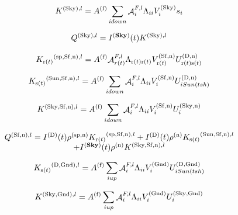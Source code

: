 \begin{equation}
{K^{{\rm{(Sky), }}l}} = {A^{{\rm{(f)}}}}\sum\limits_{i{\rm{ }}down} {{\mathop{\rm \mathcal{A}}\nolimits}_i^{F,l}{\Lambda_{ii}}V_i^{{\rm{(Sky)}}}{s_i}}
\end{equation}

\begin{equation}
{Q^{{\rm{(Sky), }}l}} = {I^{({\bf{Sky}})}}(t){K^{{\rm{(Sky), }}l}}
\end{equation}

\begin{equation}
{K_{{\rm{r(}}t{\rm{)}}}}^{{\rm{(sp, Sf, n)}},l} = {A^{{\rm{(f)}}}}{\mathop{\rm \mathcal{A}}\nolimits}_{r(t)}^{F,l}{\Lambda_{{\rm{ r(}}t{\rm{) r(}}t{\rm{)}}}}V_{{\rm{ r(}}t{\rm{)}}}^{{\rm{(Sf, n)}}}U_{{\rm{ r(}}t{\rm{) s(}}t{\rm{)}}}^{{\rm{(D,n)}}}
\end{equation}

\begin{equation}
{K_{{\rm{s(}}t{\rm{)}}}}^{{\rm{(Sun, Sf, n)}},l} = {A^{{\rm{(f)}}}}\sum\limits_{i{\rm{ }}down} {{\mathop{\rm \mathcal{A}}\nolimits}_i^{F,l}{\Lambda_{ii}}V_i^{{\rm{(Sf, n)}}}U_{i{\rm{ }}Sun(tsh)}^{{\rm{(D,n)}}}}
\end{equation}

\begin{equation}
{K^{{\rm{(Sky, Sf, n)}},l}} = {A^{{\rm{(f)}}}}\sum\limits_{i{\rm{ }}down} {{\mathop{\rm \mathcal{A}}\nolimits}_i^{F,l}{\Lambda_{ii}}V_i^{{\rm{(Sf, n)}}}U_i^{{\rm{(Sky, n)}}}}
\end{equation}

\begin{equation}
\begin{array}{c}{Q^{{\rm{(Sf,n)}},l}} = {I^{{\rm{(D)}}}}(t){\rho ^{{\rm{(sp, n)}}}}{K_{{\rm{r(}}t{\rm{)}}}}^{{\rm{(sp, Sf, n)}},l} + {I^{{\rm{(D)}}}}(t){\rho ^{{\rm{(n)}}}}{K_{{\rm{s(}}t{\rm{)}}}}^{{\rm{(Sun, Sf, n)}},l}\\ + {I^{({\bf{Sky}})}}(t){\rho ^{{\rm{(n)}}}}{K^{{\rm{(Sky, Sf, n)}},l}}\end{array}
\end{equation}

\begin{equation}
{K_{{\rm{s(}}t{\rm{)}}}}^{{\rm{(D, Gnd)}},l} = {A^{{\rm{(f)}}}}\sum\limits_{i{\rm{ }}up} {{\mathop{\rm \mathcal{A}}\nolimits}_i^{F,l}{\Lambda_{ii}}V_i^{{\rm{(Gnd)}}}U_{i{\rm{ }}Sun(tsh)}^{{\rm{(D, Gnd)}}}}
\end{equation}

\begin{equation}
{K^{{\rm{(Sky, Gnd)}},l}} = {A^{{\rm{(f)}}}}\sum\limits_{i{\rm{ }}up} {{\mathop{\rm \mathcal{A}}\nolimits}_i^{F,l}{\Lambda_{ii}}V_i^{{\rm{(Gnd)}}}U_i^{{\rm{(Sky, Gnd)}}}}
\end{equation}

